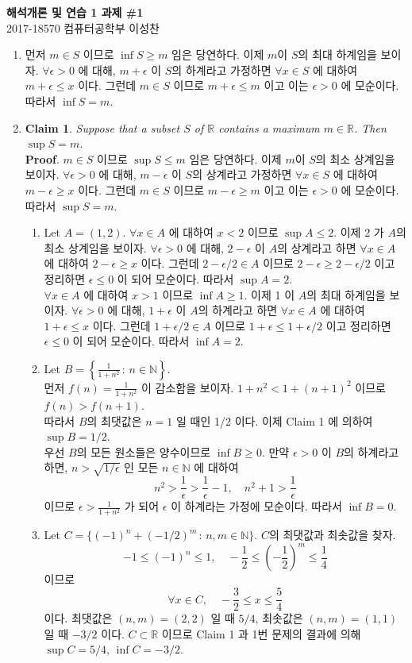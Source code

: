 \documentclass[12pt]{report}
\newcommand{\numl}[1]{\item[\large\textbf{\sffamily #1.}]}
\newcommand{\num}[1]{\item[\textbf{\sffamily #1}]}
\newcommand{\bb}[1]{\mathbb{#1}}
\begin{document}
\begin{center}
\textbf{\Large 해석개론 및 연습 1 과제 \#1}\\
\large 2017-18570 컴퓨터공학부 이성찬
\end{center}
\begin{enumerate}
\numl{1} 먼저 $ m\in S $ 이므로 $ \inf{S}\geq m $ 임은 당연하다. 이제 $ m $이 $S$의 최대 하계임을 보이자. $\forall \epsilon >0$ 에 대해, $m+\epsilon$ 이 $S$의 하계라고 가정하면 $\forall x\in S$ 에 대하여 $m+\epsilon \leq x$ 이다. 그런데 $m\in S$ 이므로 $m+\epsilon \leq m$ 이고 이는 $\epsilon > 0$ 에 모순이다. 따라서 $\inf S = m$.

\numl{2} \textbf{Claim 1}. \textit{Suppose that a subset $S$ of $\bb{R}$ contains a maximum $m\in \bb{R}$. Then $\sup S = m$.}\\
\textbf{Proof}. $m\in S$ 이므로 $\sup S \leq m$ 임은 당연하다. 이제 $m$이 $S$의 최소 상계임을 보이자. $\forall \epsilon >0$ 에 대해, $m - \epsilon$ 이 $S$의 상계라고 가정하면 $\forall x\in S$ 에 대하여 $m-\epsilon \geq x$ 이다. 그런데 $m\in S$ 이므로 $m-\epsilon \geq m$ 이고 이는 $\epsilon >0$ 에 모순이다. 따라서 $\sup S = m$.
\begin{enumerate}
	\num{(1)} Let $ A = (1, 2) $. $\forall x\in A$ 에 대하여 $x<2$ 이므로 $\sup A \leq 2$. 이제 2 가 $A$의 최소 상계임을 보이자. $\forall \epsilon > 0$ 에 대해, $2-\epsilon$ 이 $A$의 상계라고 하면 $\forall x \in A$ 에 대하여 $2-\epsilon \geq x$ 이다. 그런데 $2 - \epsilon / 2 \in A$ 이므로 $2-\epsilon \geq 2 - \epsilon /2$ 이고 정리하면 $\epsilon \leq 0$ 이 되어 모순이다. 따라서 $\sup A = 2$.\\
	$\forall x\in A$ 에 대하여 $x> 1$ 이므로 $\inf A \geq 1$. 이제 1 이 $A$의 최대 하계임을 보이자. $\forall \epsilon > 0$ 에 대해, $1+\epsilon$ 이 $A$의 하계라고 하면 $\forall x \in A$ 에 대하여 $1+\epsilon \leq x$ 이다. 그런데 $1+\epsilon / 2 \in A$ 이므로 $1+\epsilon \leq 1+ \epsilon /2$ 이고 정리하면 $\epsilon \leq 0$ 이 되어 모순이다. 따라서 $\inf A = 2$.
	\num{(2)} Let $ B = \left\{\frac{1}{1 + n^2}\,:\,n\in\bb{N}\right\} $. \\
	먼저 $f(n) = \frac{1}{1+n^2}$ 이 감소함을 보이자. $1 + n^2 < 1+ (n+1)^2$ 이므로 $f(n) > f(n+1)$.\\
	따라서 $B$의 최댓값은 $n=1$ 일 때인 1/2 이다. 이제 Claim 1 에 의하여 $\sup B = 1/2$.\\
	우선 $B$의 모든 원소들은 양수이므로 $\inf B\geq 0$. 만약 $\epsilon > 0$ 이 $B$의 하계라고 하면, $n > \sqrt{1/\epsilon} $ 인 모든 $n\in \bb{N}$ 에 대하여 $$n^2 > \frac{1}{\epsilon} > \frac{1}{\epsilon} - 1,\quad n^2+1>\frac{1}{\epsilon}$$ 이므로 $\epsilon > \frac{1}{1 + n^2}$ 가 되어 $\epsilon$ 이 하계라는 가정에 모순이다. 따라서 $\inf B = 0$.
	\num{(3)} Let $C = \{(-1)^n + (-1/2)^m\,:\,n, m\in \bb{N}\}$. $C$의 최댓값과 최솟값을 찾자. $$-1\leq (-1)^n\leq 1, \quad -\frac{1}{2}\leq \left(-\frac{1}{2}\right)^m \leq \frac{1}{4}$$ 이므로 $$\forall x \in C, \quad -\frac{3}{2} \leq x \leq \frac{5}{4}$$ 이다. 최댓값은 $(n, m) = (2, 2)$ 일 때 $5/4$, 최솟값은 $(n, m) = (1, 1)$ 일 때 $-3/2$ 이다. $C\subset \bb{R}$ 이므로 Claim 1 과 1번 문제의 결과에 의해 $\sup C = 5/4$, $\inf C = -3/2$.
\end{enumerate}


\end{enumerate}
\end{document}
